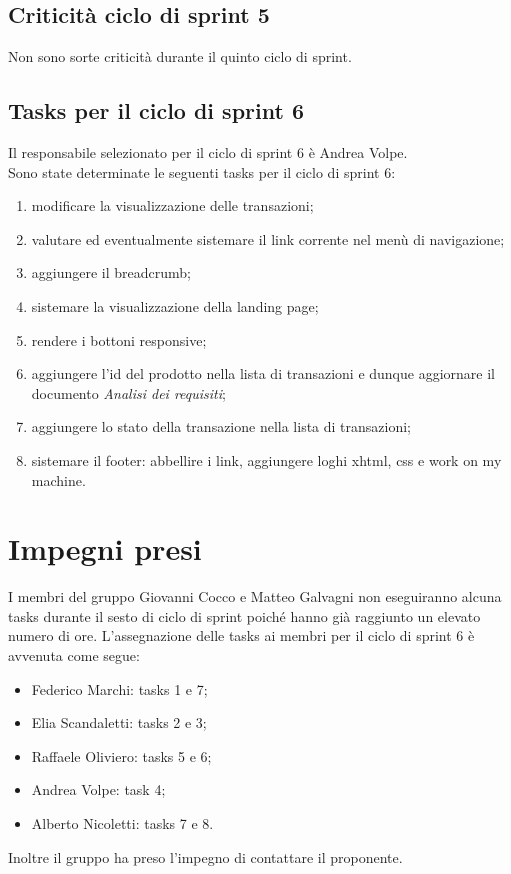 \documentclass[a4paper, 12pt]{article}
\begin{document}
\subsection{Criticità ciclo di sprint 5}
Non sono sorte criticità durante il quinto ciclo di sprint.


\subsection{Tasks per il ciclo di sprint 6}
Il responsabile selezionato per il ciclo di sprint 6 è Andrea Volpe. \\
Sono state determinate le seguenti tasks per il ciclo di sprint 6:
\begin{enumerate}
	\item modificare la visualizzazione delle transazioni;
  \item valutare ed eventualmente sistemare il link corrente nel menù di navigazione;
  \item aggiungere il breadcrumb;
  \item sistemare la visualizzazione della landing page;
  \item rendere i bottoni responsive;
  \item aggiungere l'id del prodotto nella lista di transazioni e dunque aggiornare il documento \textit{Analisi dei requisiti};
  \item aggiungere lo stato della transazione nella lista di transazioni;
  \item sistemare il footer: abbellire i link, aggiungere loghi xhtml, css e work on my machine.
\end{enumerate}

\section{Impegni presi}
I membri del gruppo Giovanni Cocco e Matteo Galvagni non eseguiranno alcuna tasks durante il sesto di ciclo di sprint poiché hanno già raggiunto un elevato numero di ore.
L'assegnazione delle tasks ai membri per il ciclo di sprint 6 è avvenuta come segue:
\begin{itemize}
  \item Federico Marchi: tasks 1 e 7;
  \item Elia Scandaletti: tasks 2 e 3;
  \item Raffaele Oliviero: tasks 5 e 6;
  \item Andrea Volpe: task 4;
  \item Alberto Nicoletti: tasks 7 e 8.
\end{itemize}
Inoltre il gruppo ha preso l'impegno di contattare il proponente.
\end{document}
